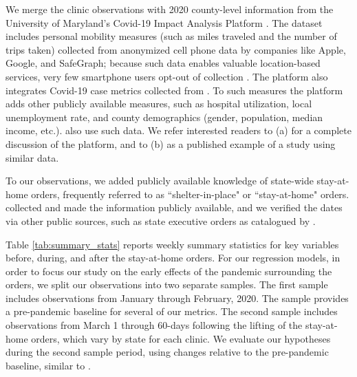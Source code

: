  We merge the clinic observations with 2020 county-level information from the University of Maryland’s Covid-19 Impact Analysis Platform \citep{MTI2020}. The dataset includes personal mobility measures (such as miles traveled and the number of trips taken) collected from anonymized cell phone data by companies like Apple, Google, and SafeGraph; because such data enables valuable location-based services, very few smartphone users opt-out of collection \citep{Anderson2016}. The platform also integrates Covid-19 case metrics collected from \cite{JHU2021}. To such measures the platform adds other publicly available measures, such as hospital utilization, local unemployment rate, and county demographics (gender, population, median income, etc.).  also use such data. We refer interested readers to (a) \cite{Zhang2020} for a complete discussion of the platform, and to (b) \cite{Wang2021} as a published example of a study using similar data. 
 
 To our observations, we added publicly available knowledge of state-wide stay-at-home orders, frequently referred to as “shelter-in-place" or “stay-at-home" orders. \cite{Goolsbee2020_unpub} collected and made the information publicly available, and we verified the dates via other public sources, such as state executive orders as catalogued by \cite{Ballotpedia2020}. 
 
 Table \ref{tab:summary_stats} reports weekly summary statistics for key variables before, during, and after the stay-at-home orders. For our regression models, in order to focus our study on the early effects of the pandemic surrounding the orders, we split our observations into two separate samples. The first sample includes observations from January through February, 2020. The sample provides a pre-pandemic baseline for several of our metrics. The second sample includes observations from March 1 through 60-days following the lifting of the stay-at-home orders, which vary by state for each clinic. We evaluate our hypotheses during the second sample period, using changes relative to the pre-pandemic baseline, similar to \cite{Goolsbee2020_key}.

